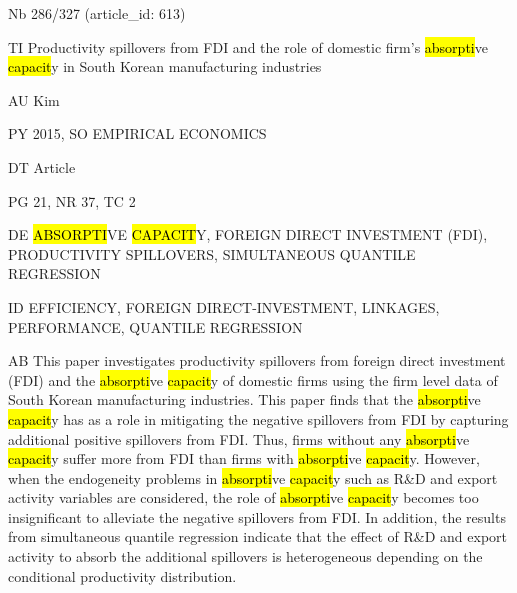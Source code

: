 \documentclass[a4paper]{article}
\begin{document}
\vspace*{-2cm}
Nb \tabto{0cm}286/327 (article\_id: 613)\par
TI \tabto{0cm}Productivity spillovers from FDI and the role of domestic firm's \hl{absorpti}ve \hl{capacit}y in South Korean manufacturing industries\par
AU \tabto{0cm}Kim\par
PY \tabto{0cm}2015, SO EMPIRICAL ECONOMICS\par
DT \tabto{0cm}Article\par
PG \tabto{0cm}21, NR 37, TC 2\par
DE \tabto{0cm}\hl{ABSORPTI}VE \hl{CAPACIT}Y, FOREIGN DIRECT INVESTMENT (FDI), PRODUCTIVITY SPILLOVERS, SIMULTANEOUS QUANTILE REGRESSION\par
ID \tabto{0cm}EFFICIENCY, FOREIGN DIRECT-INVESTMENT, LINKAGES, PERFORMANCE, QUANTILE REGRESSION\par
AB \tabto{0cm}This paper investigates productivity spillovers from foreign direct investment (FDI) and the \hl{absorpti}ve \hl{capacit}y of domestic firms using the firm level data of South Korean manufacturing industries. This paper finds that the \hl{absorpti}ve \hl{capacit}y has as a role in mitigating the negative spillovers from FDI by capturing additional positive spillovers from FDI. Thus, firms without any \hl{absorpti}ve \hl{capacit}y suffer more from FDI than firms with \hl{absorpti}ve \hl{capacit}y. However, when the endogeneity problems in \hl{absorpti}ve \hl{capacit}y such as R\&D and export activity variables are considered, the role of \hl{absorpti}ve \hl{capacit}y becomes too insignificant to alleviate the negative spillovers from FDI. In addition, the results from simultaneous quantile regression indicate that the effect of R\&D and export activity to absorb the additional spillovers is heterogeneous depending on the conditional productivity distribution.\par
\clearpage
\end{document}
